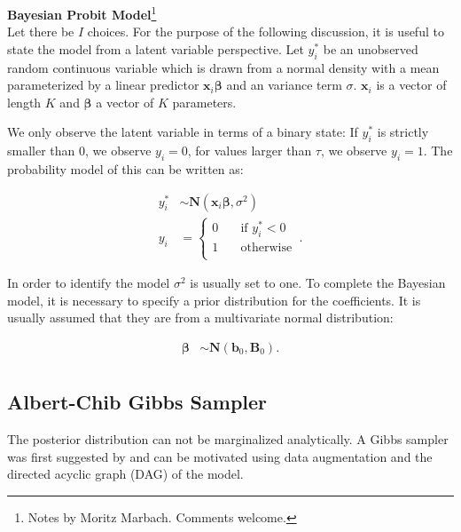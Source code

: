 \documentclass[11pt,a4paper]{article}
\begin{document}
\textbf{Bayesian Probit Model}\footnote{Notes by Moritz Marbach. Comments welcome.} \\

Let there be $I$ choices. For the purpose of the following discussion, it is useful to state the model from a latent variable perspective. Let $y_{i}^{*}$ be an unobserved random continuous variable which is drawn from a normal density with a mean parameterized by a linear predictor $\mathbf{x}_i \boldsymbol{\beta}$ and an variance term $\sigma$. $\mathbf{x}_i$ is a vector of length $K$ and $\boldsymbol{\beta}$ a vector of $K$ parameters. 

We only observe the latent variable in terms of a binary state: If $y_{i}^{*}$ is strictly smaller than 0, we observe $y_{i}=0$, for values larger than $\tau$, we observe $y_{i}=1$. The probability model of this can be written as:

\begin{equation}
\begin{split}
y^{*}_i &\sim \mathrm{\mathbf{N}}(\textbf{x}_i \boldsymbol{\beta} ,\sigma^2) \\
y_{i} &= \left \{
\begin{array}{ll}
	0 & \quad \text{if $y_{i}^{*} < 0$ }\\
	1 & \quad \text{otherwise}\\
\end{array} \right..
\end{split}	
\end{equation}

In order to identify the model $\sigma^2$ is usually set to one. To complete the Bayesian model, it is necessary to specify a prior distribution for the coefficients. It is usually assumed that they are from a multivariate normal distribution: 

\begin{equation}
\begin{split}
\boldsymbol{\beta} &\sim \mathrm{\mathbf{N}}(\textbf{b}_0, \textbf{B}_0). \\
\end{split}
\end{equation}

\subsection*{Albert-Chib Gibbs Sampler}

The posterior distribution can not be marginalized analytically. A Gibbs sampler was first suggested by \citet{Albert.Chib.1993} and can be motivated using data augmentation and the directed acyclic graph (DAG) of the model. 
\end{document}

